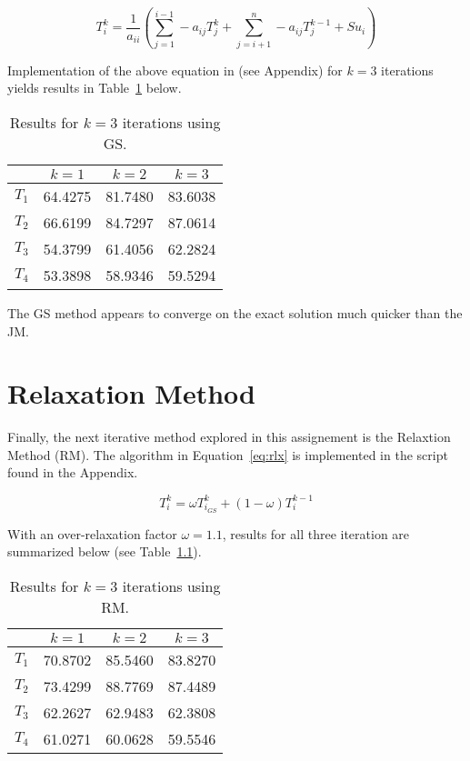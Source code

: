 \begin{equation}
	\label{eq:gs}	
	T_i^k = \frac{1}{a_{ii}} \left( \sum_{j=1}^{i-1} - a_{ij} T_j^k  + \sum_{j=i+1}^{n} - a_{ij} T_j^{k-1} + Su_i \right)
\end{equation}

Implementation of the above equation in \cite{python}(see Appendix) for $k=3$ iterations yields results in Table~\ref{tab:gs} below.

\begin{table}[H]
  \centering
  \caption{Results for $k=3$ iterations using GS.}
    \begin{tabular}{cccc}
    \hline
          & $k=1$ & $k=2$ & $k=3$ \\
    \midrule
    $T_1$ & 64.4275 & 81.7480 & 83.6038 \\
    $T_2$ & 66.6199 & 84.7297 & 87.0614 \\
    $T_3$ & 54.3799 & 61.4056 & 62.2824 \\
    $T_4$ & 53.3898 & 58.9346 & 59.5294 \\
    \hline
    \end{tabular}
  \label{tab:gs}
\end{table}

The GS method appears to converge on the exact solution much quicker than the JM.\\

\chapter{Relaxation Method}
\label{chap:relax}


Finally, the next iterative method explored in this assignement is the Relaxtion Method (RM). The algorithm in Equation~\ref{eq:rlx} \cite{cfdbook} is implemented in the script found in the Appendix.

\begin{equation}
	\label{eq:rlx}	
	T_i^k = \omega T_{i_{GS}}^k +(1-\omega)T_i^{k-1}
\end{equation}

With an over-relaxation factor $\omega=1.1$, results for all three iteration are summarized below (see Table~\ref{tab:rm}).

\begin{table}[H]
  \centering
  \caption{Results for $k=3$ iterations using RM.}
    \begin{tabular}{cccc}
    \hline
          & $k=1$ & $k=2$ & $k=3$ \\
    \midrule
    $T_1$ & 70.8702 & 85.5460 & 83.8270 \\
    $T_2$ & 73.4299 & 88.7769 & 87.4489 \\
    $T_3$ & 62.2627 & 62.9483 & 62.3808 \\
    $T_4$ & 61.0271 & 60.0628 & 59.5546 \\
    \hline
    \end{tabular}
  \label{tab:rm}
\end{table}

